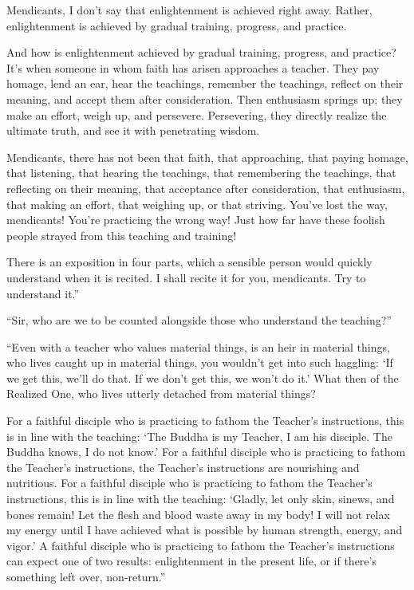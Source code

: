 \documentclass[12pt,openany]{book}%
\begin{document}
Mendicants, I don’t say that enlightenment is achieved right away. Rather, enlightenment is achieved by gradual training, progress, and practice. 

And how is enlightenment achieved by gradual training, progress, and practice? It’s when someone in whom faith has arisen approaches a teacher. They pay homage, lend an ear, hear the teachings, remember the teachings, reflect on their meaning, and accept them after consideration. Then enthusiasm springs up; they make an effort, weigh up, and persevere. Persevering, they directly realize the ultimate truth, and see it with penetrating wisdom. 

Mendicants, there has not been that faith, that approaching, that paying homage, that listening, that hearing the teachings, that remembering the teachings, that reflecting on their meaning, that acceptance after consideration, that enthusiasm, that making an effort, that weighing up, or that striving. You’ve lost the way, mendicants! You’re practicing the wrong way! Just how far have these foolish people strayed from this teaching and training! 

There is an exposition in four parts, which a sensible person would quickly understand when it is recited. I shall recite it for you, mendicants. Try to understand it.” 

“Sir, who are we to be counted alongside those who understand the teaching?” 

“Even with a teacher who values material things, is an heir in material things, who lives caught up in material things, you wouldn’t get into such haggling: ‘If we get this, we’ll do that. If we don’t get this, we won’t do it.’ What then of the Realized One, who lives utterly detached from material things? 

For a faithful disciple who is practicing to fathom the Teacher’s instructions, this is in line with the teaching: ‘The Buddha is my Teacher, I am his disciple. The Buddha knows, I do not know.’ For a faithful disciple who is practicing to fathom the Teacher’s instructions, the Teacher’s instructions are nourishing and nutritious. For a faithful disciple who is practicing to fathom the Teacher’s instructions, this is in line with the teaching: ‘Gladly, let only skin, sinews, and bones remain! Let the flesh and blood waste away in my body! I will not relax my energy until I have achieved what is possible by human strength, energy, and vigor.’ A faithful disciple who is practicing to fathom the Teacher’s instructions can expect one of two results: enlightenment in the present life, or if there’s something left over, non-return.” 
\end{document}
